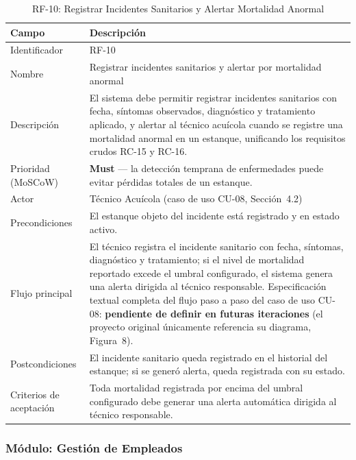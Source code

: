 \documentclass[12pt,a4paper]{article}
\begin{document}
\begin{table}[H]
\centering
\caption{RF-10: Registrar Incidentes Sanitarios y Alertar Mortalidad Anormal}
\begin{tabular}{|p{3.6cm}|p{10.4cm}|}
\hline
\textbf{Campo} & \textbf{Descripción} \\
\hline
Identificador & RF-10 \\ \hline
Nombre & Registrar incidentes sanitarios y alertar por mortalidad anormal \\ \hline
Descripción & El sistema debe permitir registrar incidentes sanitarios con
fecha, síntomas observados, diagnóstico y tratamiento aplicado, y alertar al
técnico acuícola cuando se registre una mortalidad anormal en un estanque,
unificando los requisitos crudos RC-15 y RC-16. \\ \hline
Prioridad (MoSCoW) & \textbf{Must} --- la detección temprana de enfermedades
puede evitar pérdidas totales de un estanque. \\ \hline
Actor & Técnico Acuícola (caso de uso CU-08, Sección~4.2) \\ \hline
Precondiciones & El estanque objeto del incidente está registrado y en estado
activo. \\ \hline
Flujo principal & El técnico registra el incidente sanitario con fecha,
síntomas, diagnóstico y tratamiento; si el nivel de mortalidad reportado
excede el umbral configurado, el sistema genera una alerta dirigida al
técnico responsable. Especificación textual completa del flujo paso a paso
del caso de uso CU-08: \textbf{pendiente de definir en futuras iteraciones}
(el proyecto original únicamente referencia su diagrama, Figura~8). \\ \hline
Postcondiciones & El incidente sanitario queda registrado en el historial del
estanque; si se generó alerta, queda registrada con su estado. \\ \hline
Criterios de aceptación & Toda mortalidad registrada por encima del umbral
configurado debe generar una alerta automática dirigida al técnico
responsable. \\ \hline
\end{tabular}
\end{table}

\subsubsection{Módulo: Gestión de Empleados}
\end{document}
